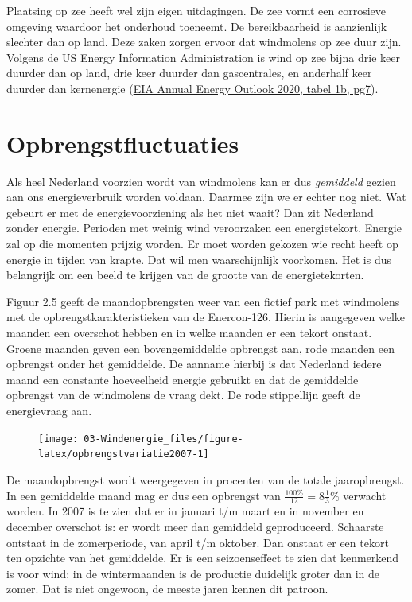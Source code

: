 \documentclass[
  11pt,
  a4paper,
]{book}
\begin{document}
Plaatsing op zee heeft wel zijn eigen uitdagingen. De zee vormt een corrosieve omgeving waardoor het onderhoud toeneemt. De bereikbaarheid
is aanzienlijk slechter dan op land. Deze zaken zorgen ervoor dat windmolens op zee duur zijn. Volgens de US Energy Information
Administration is wind op zee bijna drie keer duurder dan op land, drie keer duurder dan gascentrales, en anderhalf keer duurder dan kernenergie
(\href{https://www.eia.gov/outlooks/aeo/pdf/electricity_generation.pdf}{EIA Annual Energy Outlook 2020, tabel 1b, pg7}).

\hypertarget{opbrengstfluctuaties}{%
\section{Opbrengstfluctuaties}\label{opbrengstfluctuaties}}

Als heel Nederland voorzien wordt van windmolens kan er dus \emph{gemiddeld} gezien aan ons energieverbruik worden voldaan. Daarmee zijn we er echter nog niet. Wat gebeurt er met de energievoorziening als het niet waait? Dan zit Nederland zonder energie. Perioden met weinig wind veroorzaken een energietekort. Energie zal op die momenten prijzig worden. Er moet worden gekozen wie recht heeft op energie in tijden van krapte. Dat wil men waarschijnlijk voorkomen. Het is dus belangrijk om een beeld te krijgen van de grootte van de energietekorten.

Figuur 2.5 geeft de maandopbrengsten weer van een fictief park met windmolens met de
opbrengstkarakteristieken van de Enercon-126. Hierin is aangegeven welke maanden een overschot hebben en in welke maanden er een tekort onstaat. Groene maanden geven een bovengemiddelde opbrengst aan, rode maanden een opbrengst onder het gemiddelde. De aanname hierbij is dat Nederland iedere maand een constante hoeveelheid energie gebruikt en dat de gemiddelde opbrengst van de windmolens de vraag dekt. De rode stippellijn geeft de energievraag aan.

\begin{figure}[!t]

{\centering \texttt{[image: 03-Windenergie\_files/figure-latex/opbrengstvariatie2007-1]} 

}

\end{figure}

De maandopbrengst wordt weergegeven in procenten van de totale jaaropbrengst. In een gemiddelde maand mag er dus een opbrengst van \(\frac{100 \%}{12} = 8\frac{1}{3}\%\) verwacht worden. In 2007 is te zien dat er in januari t/m maart en in november en december overschot is: er wordt meer dan gemiddeld geproduceerd. Schaarste ontstaat in de zomerperiode, van april t/m oktober. Dan onstaat er een tekort ten opzichte van het gemiddelde. Er is een seizoenseffect te zien dat kenmerkend is voor wind: in de wintermaanden is de productie duidelijk groter dan in de zomer. Dat is niet ongewoon, de meeste jaren kennen dit patroon.
\end{document}
